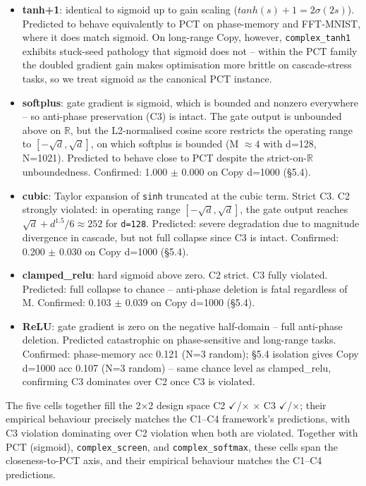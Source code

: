 \documentclass[11pt,a4paper]{article}
\theoremstyle{plain}
\theoremstyle{definition}
\begin{document}
\begin{itemize}
  \item \textbf{tanh+1}: identical to sigmoid up to gain scaling ($tanh(s) + 1 = 2\sigma (2s)$). Predicted to behave equivalently to PCT on phase-memory and FFT-MNIST, where it does match sigmoid. On long-range Copy, however, \texttt{complex\_tanh1} exhibits stuck-seed pathology that sigmoid does not -- within the PCT family the doubled gradient gain makes optimisation more brittle on cascade-stress tasks, so we treat sigmoid as the canonical PCT instance.
  \item \textbf{softplus}: gate gradient is sigmoid, which is bounded and nonzero everywhere -- so anti-phase preservation (C3) is intact. The gate output is unbounded above on $\mathbb{R}$, but the L2-normalised cosine score restricts the operating range to $[-\sqrt{d}, \sqrt{d}]$, on which softplus is bounded (M $\approx 4$ with d=128, N=1021). Predicted to behave close to PCT despite the strict-on-$\mathbb{R}$ unboundedness. Confirmed: 1.000 $\pm$ 0.000 on Copy d=1000 (\S{}5.4).
  \item \textbf{cubic}: Taylor expansion of \texttt{sinh} truncated at the cubic term. Strict C3. C2 strongly violated: in operating range $[-\sqrt{d}, \sqrt{d}]$, the gate output reaches $\sqrt{d} + d^{1.5}/6 \approx 252$ for \texttt{d=128}. Predicted: severe degradation due to magnitude divergence in cascade, but not full collapse since C3 is intact. Confirmed: 0.200 $\pm$ 0.030 on Copy d=1000 (\S{}5.4).
  \item \textbf{clamped\_relu}: hard sigmoid above zero. C2 strict. C3 fully violated. Predicted: full collapse to chance -- anti-phase deletion is fatal regardless of M. Confirmed: 0.103 $\pm$ 0.039 on Copy d=1000 (\S{}5.4).
  \item \textbf{ReLU}: gate gradient is zero on the negative half-domain -- full anti-phase deletion. Predicted catastrophic on phase-sensitive and long-range tasks. Confirmed: phase-memory acc 0.121 (N=3 random); \S{}5.4 isolation gives Copy d=1000 acc 0.107 (N=3 random) -- same chance level as clamped\_relu, confirming C3 dominates over C2 once C3 is violated.
\end{itemize}

The five cells together fill the 2$\times$2 design space {C2 $\checkmark$/$\times$} $\times$ {C3 $\checkmark$/$\times$}; their empirical behaviour precisely matches the C1--C4 framework's predictions, with C3 violation dominating over C2 violation when both are violated. Together with PCT (sigmoid), \texttt{complex\_screen}, and \texttt{complex\_softmax}, these cells span the closeness-to-PCT axis, and their empirical behaviour matches the C1--C4 predictions.
\end{document}
